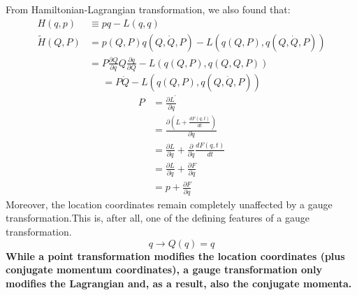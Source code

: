 From Hamiltonian-Lagrangian transformation, we also found that:
$$
\begin{aligned}
H(q, p) & \equiv p q-L(q, q) \\
\tilde{H}(Q, P) &=p(Q, P) q(Q, \dot{Q}, P)-L(q(Q, P), q(Q, \dot{Q}, P)) \\
&=P \frac{\partial Q}{\partial q} Q \frac{\partial q}{\partial Q}-L(q(Q, P), q(Q, Q, P))
\end{aligned}
$$
$$
=P \dot{Q}-L(q(Q, P), q(Q, \dot{Q}, P))
$$
\begin{equation}
    \begin{aligned}
P &=\frac{\partial L^{\prime}}{\partial \dot{q}} \\
&=\frac{\partial\left(L+\frac{d F(q, t)}{d t}\right)}{\partial \dot{q}} \\
&=\frac{\partial L}{\partial \dot{q}}+\frac{\partial}{\partial \dot{q}} \frac{d F(q, t)}{d t} \\
&=\frac{\partial L}{\partial \dot{q}}+\frac{\partial F}{\partial q} \\
&=p+\frac{\partial F}{\partial q}
\end{aligned}
\label{canongauge1}
\end{equation}
Moreover, the location coordinates remain completely unaffected by a gauge transformation.This is, after all, one of the defining features of a gauge transformation. 
\begin{equation}
q \rightarrow Q(q)=q
\end{equation}
\textbf{While a point transformation modifies the location coordinates (plus conjugate momentum coordinates), a gauge transformation only modifies the Lagrangian and, as a result, also the conjugate momenta.}

